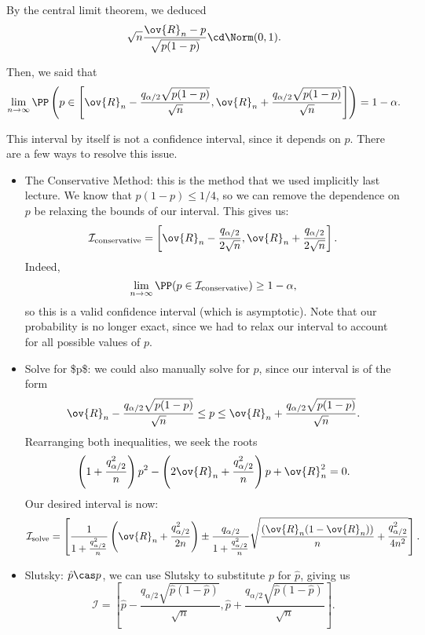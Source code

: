 By the central limit theorem, we deduced
\[\sqrt{n}\frac{\ov{R}_n-p}{\sqrt{p(1-p)}}\cd \Norm(0,1).\]

Then, we said that 
\[\lim_{n\rightarrow \infty}\PP\left(p\in \left[\ov{R}_n-\frac{q_{\alpha/2}\sqrt{p(1-p)}}{\sqrt{n}}, \ov{R}_n+\frac{q_{\alpha/2}\sqrt{p(1-p)}}{\sqrt{n}}\right]\right) = 1-\alpha.\]

This interval by itself is not a confidence interval, since it depends on $p$. There are a few ways to resolve this issue. 

\begin{itemize}
    \item \ac{The Conservative Method}: this is the method that we used implicitly last lecture. We know that $p(1-p)\leq 1/4$, so we can remove the dependence on $p$ be relaxing the bounds of our interval. This gives us: 
    \[\mathcal{I}_{\text{conservative}} = \left[\ov{R}_n - \frac{q_{\alpha/2}}{2\sqrt{n}}, \ov{R}_n + \frac{q_{\alpha/2}}{2\sqrt{n}}\right].\]
    Indeed, 
    \[\lim_{n\rightarrow \infty}\PP(p\in \mathcal{I}_{\text{conservative}})\geq 1-\alpha,\]
    so this is a valid confidence interval (which is asymptotic). Note that our probability is no longer exact, since we had to relax our interval to account for all possible values of $p$. 
    \item \ac{Solve for $p$}: we could also manually solve for $p$, since our interval is of the form
    \[\ov{R}_n-\frac{q_{\alpha/2}\sqrt{p(1-p)}}{\sqrt{n}} \leq p \leq \ov{R}_n+\frac{q_{\alpha/2}\sqrt{p(1-p)}}{\sqrt{n}}.\]
    Rearranging both inequalities, we seek the roots 
    \[\left(1 + \frac{q_{\alpha/2}^2}{n}\right)p^2 - \left(2\ov{R}_n + \frac{q_{\alpha/2}^2}{n}\right)p + \ov{R}_n^2 = 0.\]
    Our desired interval is now: 
    \begin{align*}
        \mathcal{I}_{\text{solve}} = \left[\frac{1}{1+\frac{q_{\alpha/2}^2}{n}}\left(\ov{R}_n + \frac{q_{\alpha/2}^2}{2n}\right)\pm\frac{q_{\alpha/2}}{1+\frac{q_{\alpha/2}^2}{n}}\sqrt{\frac{(\ov{R}_n(1-\ov{R}_n))}{n} + \frac{q_{\alpha/2}^2}{4n^2}}\right].
    \end{align*}
    \item \ac{Slutsky}: $\hat{p}\cas p$, we can use Slutsky to substitute $p$ for $\hat{p}$, giving us
    \[\mathcal{I} = \left[\hat{p} - \frac{q_{\alpha/2}\sqrt{\hat{p}(1-\hat{p})}}{\sqrt{n}}, \hat{p} + \frac{q_{\alpha/2}\sqrt{\hat{p}(1-\hat{p})}}{\sqrt{n}}\right].\]
\end{itemize}



